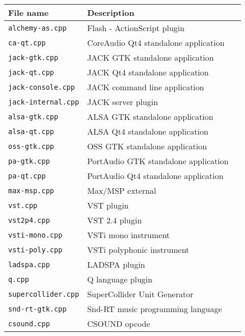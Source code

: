 \begin{table}[htp]
\begin{center}
\begin{tabular}{|l|l|l|}
\hline
\textbf{File name}		& \textbf{Description}   \\
\hline
\texttt{alchemy-as.cpp} 	& Flash - ActionScript plugin \\
\texttt{ca-qt.cpp} 		& CoreAudio Qt4 standalone application  \\
\texttt{jack-gtk.cpp} 		& JACK GTK standalone application  \\
\texttt{jack-qt.cpp} 		& JACK Qt4 standalone application  \\
\texttt{jack-console.cpp} 	& JACK command line application  \\
\texttt{jack-internal.cpp} 	& JACK server plugin  \\
\texttt{alsa-gtk.cpp} 		& ALSA GTK standalone application  \\
\texttt{alsa-qt.cpp} 		& ALSA Qt4 standalone application  \\
\texttt{oss-gtk.cpp} 		& OSS GTK standalone application  \\
\texttt{pa-gtk.cpp} 		& PortAudio GTK standalone application  \\
\texttt{pa-qt.cpp} 		& PortAudio Qt4 standalone application  \\
\hline
\texttt{max-msp.cpp} 	& Max/MSP external  \\
\texttt{vst.cpp} 			& VST plugin  \\
\texttt{vst2p4.cpp} 		& VST 2.4 plugin  \\
\texttt{vsti-mono.cpp} 	& VSTi mono instrument  \\
\texttt{vsti-poly.cpp} 		& VSTi polyphonic instrument  \\
\texttt{ladspa.cpp} 		& LADSPA plugin  \\
\texttt{q.cpp} 			& Q language plugin  \\
\texttt{supercollider.cpp} 	& SuperCollider Unit Generator  \\
\texttt{snd-rt-gtk.cpp} 	& Snd-RT music programming language  \\
\texttt{csound.cpp} 		& CSOUND opcode  \\

\end{tabular}
\end{center}
\end{table}
